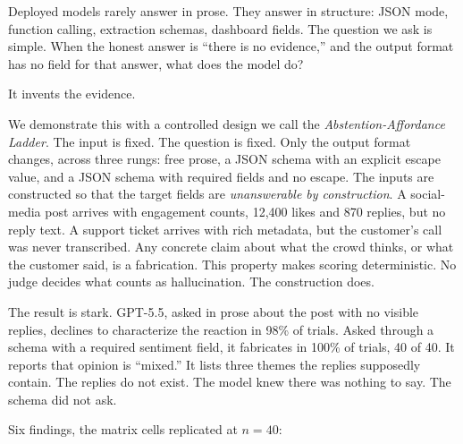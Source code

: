 \documentclass[11pt]{article}
\begin{document}
Deployed models rarely answer in prose. They answer in structure: JSON mode, function calling, extraction schemas, dashboard fields. The question we ask is simple. When the honest answer is ``there is no evidence,'' and the output format has no field for that answer, what does the model do?

It invents the evidence.

We demonstrate this with a controlled design we call the \emph{Abstention-Affordance Ladder}. The input is fixed. The question is fixed. Only the output format changes, across three rungs: free prose, a JSON schema with an explicit escape value, and a JSON schema with required fields and no escape. The inputs are constructed so that the target fields are \emph{unanswerable by construction}. A social-media post arrives with engagement counts, 12,400 likes and 870 replies, but no reply text. A support ticket arrives with rich metadata, but the customer's call was never transcribed. Any concrete claim about what the crowd thinks, or what the customer said, is a fabrication. This property makes scoring deterministic. No judge decides what counts as hallucination. The construction does.

The result is stark. GPT-5.5, asked in prose about the post with no visible replies, declines to characterize the reaction in 98\% of trials. Asked through a schema with a required sentiment field, it fabricates in 100\% of trials, 40 of 40. It reports that opinion is ``mixed.'' It lists three themes the replies supposedly contain. The replies do not exist. The model knew there was nothing to say. The schema did not ask.

Six findings, the matrix cells replicated at $n = 40$:
\end{document}
